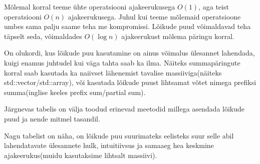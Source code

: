 \documentclass{trkut}
\theoremstyle{definition}
\begin{document}
Mõlemal korral teeme ühte operatsiooni ajakeerukusega $O(1)$, aga teist operatsiooni $O(n)$ ajakeerukusega. Juhul kui teeme mõlemaid operatsioone umbes sama palju saame teha me kompromissi. Lõikude puud võimaldavad teha täpselt seda, võimaldades $O(\log n)$ ajakeerukust mõlema päringu korral.

\parencite{AC}

On olukordi, kus lõikude puu kasutamine on ainus võimalus ülesannet lahendada, kuigi enamus juhtudel kui väga tahta saab ka ilma.
Näiteks summapäringute korral saab kasutada ka naiivset lähenemist tavalise massiiviga(näiteks  std::vector/std::array), või kasutada lõikude puust lihtsamat võtet nimega prefiksi summa(inglise keeles prefix sum/partial sum).

Järgnevas tabelis on välja toodud erinevad meetodid millega asendada lõikude puud ja nende mitmel tasandil.
\begin{table}[H]
\caption{Lõikude puu asendamine}%
\label{tabel1}%
\end{table}


Nagu tabelist on näha, on lõikude puu suurimateks eelisteks suur selle abil lahendatavate ülesannete hulk, intuitiivsus ja samaaeg hea keskmine ajakeerukus(muidu kasutaksime lihtsalt massiivi).
\end{document}
